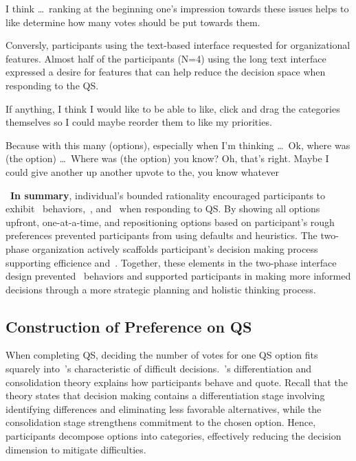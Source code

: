 \begin{displayquote}
I think \ldots\ ranking at the beginning one's impression towards these issues helps to like determine how many votes should be put towards them.  \hfill{}
\end{displayquote}

Conversly, participants using the text-based interface requested for organizational features. Almost half of the participants (N=4) using the long text interface expressed a desire for features that can help reduce the decision space when responding to the QS.

\begin{displayquote}
If anything, I think I would like to be able to like, click and drag the categories themselves so I could maybe reorder them to like my priorities. \hfill{}
\end{displayquote}

\begin{displayquote}
Because with this many (options), especially when I'm thinking \ldots\ Ok, where was (the option) \ldots\ Where was (the option) you know? Oh, that's right. Maybe I could give another up another upvote to the, you know whatever~\bracketellipsis \hfill{}
\end{displayquote}

~\textbf{In summary}, individual's bounded rationality encouraged participants to exhibit~\underline{} behaviors,~\underline{}, and~\underline{} when responding to QS. By showing all options upfront, one-at-a-time, and repositioning options based on participant's rough preferences prevented participants from using defaults and heuristics. The two-phase organization actively scaffolds participant's decision making process supporting efficience\underline{} and~\underline{}. Together, these elements in the two-phase interface design prevented~\underline{} behaviors and supported participants in making more informed decisions through a more strategic planning and holistic thinking process.



\subsection{Construction of Preference on QS}

When completing QS, deciding the number of votes for one QS option fits squarely into~\textcite{lichtensteinConstructionPreference2006}'s characteristic of difficult decisions.~\textcite{svensonDifferentiationConsolidationTheory1992}'s differentiation and consolidation theory explains how participants behave and quote. Recall that the theory states that decision making contains a differentiation stage involving identifying differences and eliminating less favorable alternatives, while the consolidation stage strengthens commitment to the chosen option. Hence, participants decompose options into categories, effectively reducing the decision dimension to mitigate difficulties.

